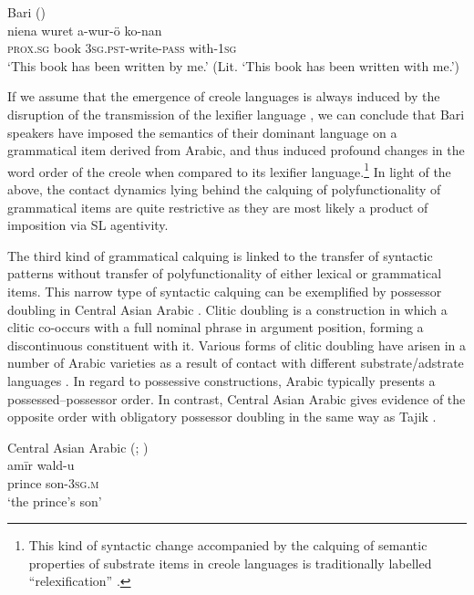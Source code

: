 \documentclass[output=paper]{langsci/langscibook}
\begin{document}
\ea
{Bari (\citealt[65]{Owen1909})}\\
\gll   niena  wuret   a-wur-ö ko-nan \\
       \textsc{prox.sg} book \textsc{3sg.pst}-write-\textsc{pass} with-\textsc{1sg}\\
\glt   `This book has been written by me.' (Lit. ‘This book has been written with me.’)
\z

If we assume that the emergence of creole languages is always induced by the disruption of the transmission of the lexifier language \citep{Comrie2011}, we can conclude that Bari speakers have imposed the semantics of their dominant language on a grammatical item derived from Arabic, and thus induced profound changes in the word order of the creole when compared to its lexifier language.\footnote{This kind of syntactic change accompanied by the calquing of semantic properties of substrate items in creole languages is traditionally labelled ``relexification'' \citep{Lefebvre1998}.}  In light of the above, the contact dynamics lying behind the calquing of polyfunctionality of grammatical items are quite restrictive as they are most likely a product of imposition via SL agentivity.  

The third kind of grammatical calquing is linked to the transfer of syntactic patterns without transfer of polyfunctionality of either lexical or grammatical items. This narrow type of syntactic calquing can be exemplified by possessor doubling in Central Asian Arabic \citep{Ratcliffe2005}. Clitic doubling is a construction in which a clitic co-occurs with a full nominal phrase in argument position, forming a discontinuous constituent with it. Various forms of clitic doubling have arisen in a number of Arabic varieties as a result of contact with different substrate/adstrate languages \citep{Souag2017clitic}. In regard to possessive constructions, Arabic typically presents a possessed–possessor order. In contrast, Central Asian Arabic  gives evidence of the opposite order with obligatory possessor doubling in the same way as Tajik . 

\ea\label{28}
{Central Asian Arabic (\citealt{Ratcliffe2005}; \citealt[56]{Souag2017clitic})}\\
\gll   amīr wald-u\\
        prince son-\textsc{3sg.m}\\
\glt   `the prince’s son'
\z

\end{document}
